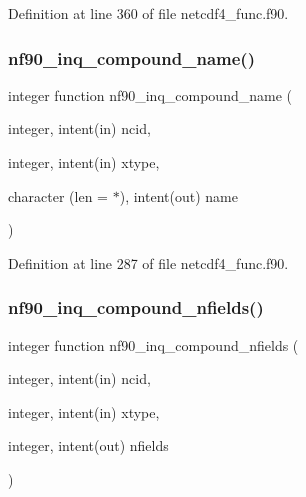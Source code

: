 Definition at line 360 of file netcdf4\+\_\+func.\+f90.

\mbox{\label{netcdf4__func_8f90_a475d80b3bf193d3406062506c8f660ab}} 
\subsubsection{\texorpdfstring{nf90\+\_\+inq\+\_\+compound\+\_\+name()}{nf90\_inq\_compound\_name()}}
{\footnotesize\ttfamily integer function nf90\+\_\+inq\+\_\+compound\+\_\+name (\begin{DoxyParamCaption}\item[{integer, intent(in)}]{ncid,  }\item[{integer, intent(in)}]{xtype,  }\item[{character (len = $\ast$), intent(out)}]{name }\end{DoxyParamCaption})}



Definition at line 287 of file netcdf4\+\_\+func.\+f90.

\mbox{\label{netcdf4__func_8f90_a69fa47019c409dbc9a8e0bf0da580ad1}} 
\subsubsection{\texorpdfstring{nf90\+\_\+inq\+\_\+compound\+\_\+nfields()}{nf90\_inq\_compound\_nfields()}}
{\footnotesize\ttfamily integer function nf90\+\_\+inq\+\_\+compound\+\_\+nfields (\begin{DoxyParamCaption}\item[{integer, intent(in)}]{ncid,  }\item[{integer, intent(in)}]{xtype,  }\item[{integer, intent(out)}]{nfields }\end{DoxyParamCaption})}



